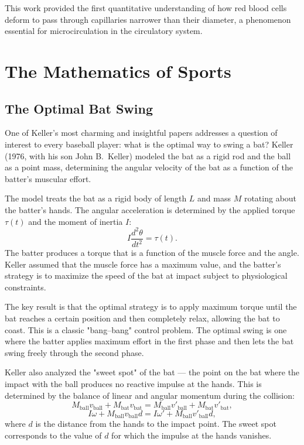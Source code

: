 This work provided the first quantitative understanding of how red blood cells deform to pass through capillaries narrower than their diameter, a phenomenon essential for microcirculation in the circulatory system.

\section{The Mathematics of Sports}

\subsection{The Optimal Bat Swing}

One of Keller's most charming and insightful papers addresses a question of interest to every baseball player: what is the optimal way to swing a bat? Keller (1976, with his son John B.\ Keller) modeled the bat as a rigid rod and the ball as a point mass, determining the angular velocity of the bat as a function of the batter's muscular effort.

The model treats the bat as a rigid body of length \(L\) and mass \(M\) rotating about the batter's hands. The angular acceleration is determined by the applied torque \(\tau(t)\) and the moment of inertia \(I\):
\[
I \frac{d^2\theta}{dt^2} = \tau(t).
\]
The batter produces a torque that is a function of the muscle force and the angle. Keller assumed that the muscle force has a maximum value, and the batter's strategy is to maximize the speed of the bat at impact subject to physiological constraints.

The key result is that the optimal strategy is to apply maximum torque until the bat reaches a certain position and then completely relax, allowing the bat to coast. This is a classic "bang--bang" control problem. The optimal swing is one where the batter applies maximum effort in the first phase and then lets the bat swing freely through the second phase.

Keller also analyzed the "sweet spot" of the bat --- the point on the bat where the impact with the ball produces no reactive impulse at the hands. This is determined by the balance of linear and angular momentum during the collision:
\[
M_{\text{ball}} v_{\text{ball}} + M_{\text{bat}} v_{\text{bat}} = M_{\text{ball}} v'_{\text{ball}} + M_{\text{bat}} v'_{\text{bat}},
\]
\[
I \omega + M_{\text{ball}} v_{\text{ball}} d = I \omega' + M_{\text{ball}} v'_{\text{ball}} d,
\]
where \(d\) is the distance from the hands to the impact point. The sweet spot corresponds to the value of \(d\) for which the impulse at the hands vanishes.


